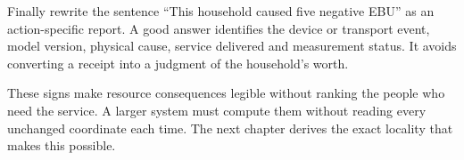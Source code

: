 Finally rewrite the sentence ``This household caused five negative EBU'' as an action-specific report. A good answer identifies the device or transport event, model version, physical cause, service delivered and measurement status. It avoids converting a receipt into a judgment of the household's worth.

These signs make resource consequences legible without ranking the people who need the service. A larger system must compute them without reading every unchanged coordinate each time. The next chapter derives the exact locality that makes this possible.
